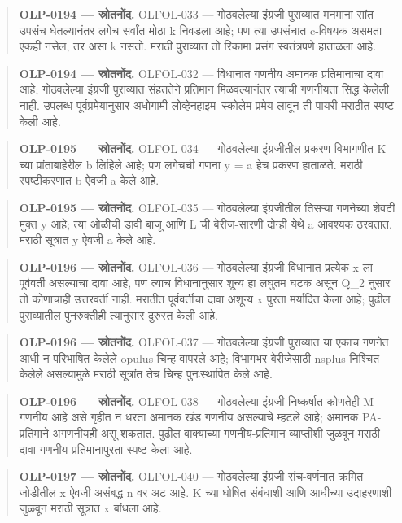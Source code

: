 \begin{quote}\small\textbf{OLP-0194 — स्रोतनोंद.} OLFOL-033 — गोठवलेल्या इंग्रजी पुराव्यात मनमाना सांत उपसंच घेतल्यानंतर लगेच सर्वांत मोठा k निवडला आहे; पण त्या उपसंचात c-विषयक असमता एकही नसेल, तर असा k नसतो. मराठी पुराव्यात तो रिकामा प्रसंग स्वतंत्रपणे हाताळला आहे.\end{quote}
\begin{quote}\small\textbf{OLP-0194 — स्रोतनोंद.} OLFOL-032 — विधानात गणनीय अमानक प्रतिमानाचा दावा आहे; गोठवलेल्या इंग्रजी पुराव्यात संहततेने प्रतिमान मिळवल्यानंतर त्याची गणनीयता सिद्ध केलेली नाही. उपलब्ध पूर्वप्रमेयानुसार अधोगामी लोव्हेनहाइम--स्कोलेम प्रमेय लावून ती पायरी मराठीत स्पष्ट केली आहे.\end{quote}
\begin{quote}\small\textbf{OLP-0195 — स्रोतनोंद.} OLFOL-034 — गोठवलेल्या इंग्रजीतील प्रकरण-विभागणीत K च्या प्रांताबाहेरील b लिहिले आहे; पण लगेचची गणना y = a हेच प्रकरण हाताळते. मराठी स्पष्टीकरणात b ऐवजी a केले आहे.\end{quote}
\begin{quote}\small\textbf{OLP-0195 — स्रोतनोंद.} OLFOL-035 — गोठवलेल्या इंग्रजीतील तिसऱ्या गणनेच्या शेवटी मुक्त y आहे; त्या ओळीची डावी बाजू आणि L ची बेरीज-सारणी दोन्ही येथे a आवश्यक ठरवतात. मराठी सूत्रात y ऐवजी a केले आहे.\end{quote}
\begin{quote}\small\textbf{OLP-0196 — स्रोतनोंद.} OLFOL-036 — गोठवलेल्या इंग्रजी विधानात प्रत्येक x ला पूर्ववर्ती असल्याचा दावा आहे, पण त्याच विधानानुसार शून्य हा लघुतम घटक असून Q\_2 नुसार तो कोणाचाही उत्तरवर्ती नाही. मराठीत पूर्ववर्तीचा दावा अशून्य x पुरता मर्यादित केला आहे; पुढील पुराव्यातील पुनरुक्तीही त्यानुसार दुरुस्त केली आहे.\end{quote}
\begin{quote}\small\textbf{OLP-0196 — स्रोतनोंद.} OLFOL-037 — गोठवलेल्या इंग्रजी पुराव्यात या एकाच गणनेत आधी न परिभाषित केलेले opulus चिन्ह वापरले आहे; विभागभर बेरीजेसाठी nsplus निश्चित केलेले असल्यामुळे मराठी सूत्रांत तेच चिन्ह पुनःस्थापित केले आहे.\end{quote}
\begin{quote}\small\textbf{OLP-0196 — स्रोतनोंद.} OLFOL-038 — गोठवलेल्या इंग्रजी निष्कर्षात कोणतेही M गणनीय आहे असे गृहीत न धरता अमानक खंड गणनीय असल्याचे म्हटले आहे; अमानक PA-प्रतिमाने अगणनीयही असू शकतात. पुढील वाक्याच्या गणनीय-प्रतिमान व्याप्तीशी जुळवून मराठी दावा गणनीय प्रतिमानापुरता स्पष्ट केला आहे.\end{quote}
\begin{quote}\small\textbf{OLP-0197 — स्रोतनोंद.} OLFOL-040 — गोठवलेल्या इंग्रजी संच-वर्णनात क्रमित जोडीतील x ऐवजी असंबद्ध n वर अट आहे. K च्या घोषित संबंधाशी आणि आधीच्या उदाहरणाशी जुळवून मराठी सूत्रात x बांधला आहे.\end{quote}

